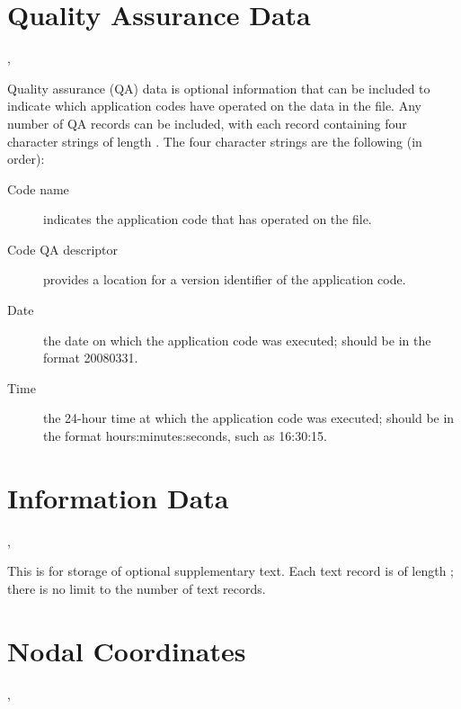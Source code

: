 \section{Quality Assurance Data}

\begin{spacing}{1.5}
\api {}, 
\end{spacing}

Quality assurance (QA) data is optional information that can be
included to indicate which application codes have operated on the data
in the file. Any number of QA records can be included, with each
record containing four character strings of length
. The four character strings are the following
(in order):

\begin{description}

\item[Code name] indicates the application code that has operated 
on the \exo{} file.

\item[Code QA descriptor] provides a location for a version 
identifier of the application code.

\item[Date] the date on which the application code was executed; 
should be in the format 20080331.

 \item[Time] the 24-hour time at which the application code 
was executed; should be in the format hours:minutes:seconds, 
such as 16:30:15.
 \end{description}


\section{Information Data}


\begin{spacing}{1.5}
\api {}, 
\end{spacing}

This is for storage of optional supplementary text. Each text record
is of length ; there is no limit to the
number of text records.


\section{Nodal Coordinates}


\begin{spacing}{1.5}
\api {}, 
\end{spacing}

